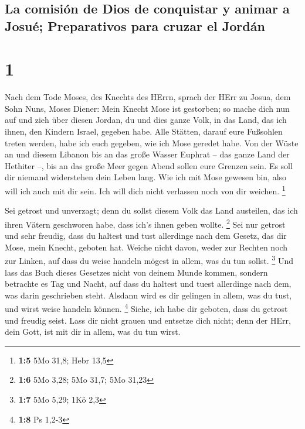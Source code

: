 \hypertarget{la-comisiuxf3n-de-dios-de-conquistar-y-animar-a-josuuxe9-preparativos-para-cruzar-el-jorduxe1n}{%
\subsection{La comisión de Dios de conquistar y animar a Josué;
Preparativos para cruzar el
Jordán}\label{la-comisiuxf3n-de-dios-de-conquistar-y-animar-a-josuuxe9-preparativos-para-cruzar-el-jorduxe1n}}

\hypertarget{section}{%
\section{1}\label{section}}

 Nach dem Tode Moses, des Knechts des HErrn, sprach der
HErr zu Josua, dem Sohn Nuns, Moses Diener:  Mein Knecht
Mose ist gestorben; so mache dich nun auf und zieh über diesen Jordan,
du und dies ganze Volk, in das Land, das ich ihnen, den Kindern Israel,
gegeben habe.  Alle Stätten, darauf eure Fußsohlen treten
werden, habe ich euch gegeben, wie ich Mose geredet habe. 
Von der Wüste an und diesem Libanon bis an das große Wasser Euphrat --
das ganze Land der Hethiter --, bis an das große Meer gegen Abend sollen
eure Grenzen sein.  Es soll dir niemand widerstehen dein
Leben lang. Wie ich mit Mose gewesen bin, also will ich auch mit dir
sein. Ich will dich nicht verlassen noch von dir weichen. \footnote{\textbf{1:5}
  5Mo 31,8; Hebr 13,5}

 Sei getrost und unverzagt; denn du sollst diesem Volk das
Land austeilen, das ich ihren Vätern geschworen habe, dass ich's ihnen
geben wollte. \footnote{\textbf{1:6} 5Mo 3,28; 5Mo 31,7; 5Mo 31,23}
 Sei nur getrost und sehr freudig, dass du haltest und
tust allerdinge nach dem Gesetz, das dir Mose, mein Knecht, geboten hat.
Weiche nicht davon, weder zur Rechten noch zur Linken, auf dass du weise
handeln mögest in allem, was du tun sollst. \footnote{\textbf{1:7} 5Mo
  5,29; 1Kö 2,3}  Und lass das Buch dieses Gesetzes nicht
von deinem Munde kommen, sondern betrachte es Tag und Nacht, auf dass du
haltest und tuest allerdinge nach dem, was darin geschrieben steht.
Alsdann wird es dir gelingen in allem, was du tust, und wirst weise
handeln können. \footnote{\textbf{1:8} Ps 1,2-3}  Siehe,
ich habe dir geboten, dass du getrost und freudig seist. Lass dir nicht
grauen und entsetze dich nicht; denn der HErr, dein Gott, ist mit dir in
allem, was du tun wirst.

